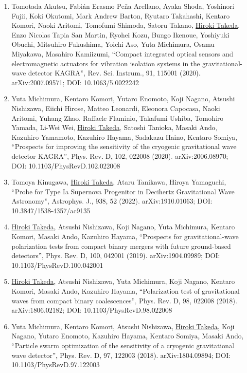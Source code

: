 \documentclass[uplatex, 12pt]{article}
\begin{document}
\begin{enumerate}
\item Tomotada Akutsu, Fabián Erasmo Peña Arellano, Ayaka Shoda, Yoshinori Fujii, Koki Okutomi, Mark Andrew Barton, Ryutaro Takahashi, Kentaro Komori, Naoki Aritomi, Tomofumi Shimoda, Satoru Takano, \uline{Hiroki Takeda}, Enzo Nicolas Tapia San Martin, Ryohei Kozu, Bungo Ikenoue, Yoshiyuki Obuchi, Mitsuhiro Fukushima, Yoichi Aso, Yuta Michimura, Osamu Miyakawa, Masahiro Kamiizumi, “Compact integrated optical sensors and electromagnetic actuators for vibration isolation systems in the gravitational-wave detector KAGRA”, Rev. Sci. Instrum., 91, 115001 (2020). arXiv:2007.09571; DOI: 10.1063/5.0022242
\item Yuta Michimura, Kentaro Komori, Yutaro Enomoto, Koji Nagano, Atsushi Nishizawa, Eiichi Hirose, Matteo Leonardi, Eleonora Capocasa, Naoki Aritomi, Yuhang Zhao, Raffaele Flaminio, Takafumi Ushiba, Tomohiro Yamada, Li-Wei Wei, \uline{Hiroki Takeda}, Satoshi Tanioka, Masaki Ando, Kazuhiro Yamamoto, Kazuhiro Hayama, Sadakazu Haino, Kentaro Somiya, “Prospects for improving the sensitivity of the cryogenic gravitational wave detector KAGRA”, Phys. Rev. D, 102, 022008 (2020). arXiv:2006.08970; DOI: 10.1103/PhysRevD.102.022008
\item Tomoya Kinugawa, \uline{Hiroki Takeda}, Ataru Tanikawa, Hiroya Yamaguchi, “Probe for Type Ia Supernova Progenitor in Decihertz Gravitational Wave Astronomy”, Astrophys. J., 938, 52 (2022). arXiv:1910.01063; DOI: 10.3847/1538-4357/ac9135
\item \uline{Hiroki Takeda}, Atsushi Nishizawa, Koji Nagano, Yuta Michimura, Kentaro Komori, Masaki Ando, Kazuhiro Hayama, “Prospects for gravitational-wave polarization tests from compact binary mergers with future ground-based detectors”, Phys. Rev. D, 100, 042001 (2019). arXiv:1904.09989; DOI: 10.1103/PhysRevD.100.042001
\item \uline{Hiroki Takeda}, Atsushi Nishizawa, Yuta Michimura, Koji Nagano, Kentaro Komori, Masaki Ando, Kazuhiro Hayama, “Polarization test of gravitational waves from compact binary coalescences”, Phys. Rev. D, 98, 022008 (2018). arXiv:1806.02182; DOI: 10.1103/PhysRevD.98.022008
\item Yuta Michimura, Kentaro Komori, Atsushi Nishizawa, \uline{Hiroki Takeda}, Koji Nagano, Yutaro Enomoto, Kazuhiro Hayama, Kentaro Somiya, Masaki Ando, “Particle swarm optimization of the sensitivity of a cryogenic gravitational wave detector”, Phys. Rev. D, 97, 122003 (2018). arXiv:1804.09894; DOI: 10.1103/PhysRevD.97.122003

\end{enumerate}
\end{document}
